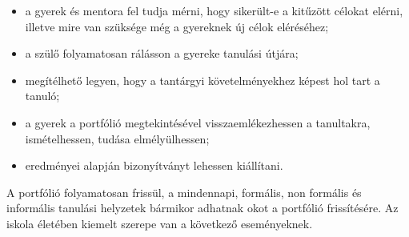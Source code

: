 \begin{itemize}
      \item a gyerek és mentora fel tudja mérni, hogy sikerült-e a kitűzött
            célokat
            elérni, illetve mire van szüksége még a gyereknek új célok
            eléréséhez;

      \item a szülő folyamatosan rálásson a gyereke tanulási útjára;

      \item megítélhető legyen, hogy a tantárgyi követelményekhez
            képest
            hol
            tart a tanuló;

      \item a gyerek a portfólió megtekintésével visszaemlékezhessen a
            tanultakra,
            ismételhessen, tudása elmélyülhessen;

      \item eredményei alapján bizonyítványt lehessen kiállítani.

\end{itemize}

A portfólió folyamatosan frissül, a mindennapi, formális, non formális és
informális tanulási helyzetek
bármikor adhatnak okot a portfólió frissítésére. Az iskola életében kiemelt
szerepe van a következő eseményeknek.

